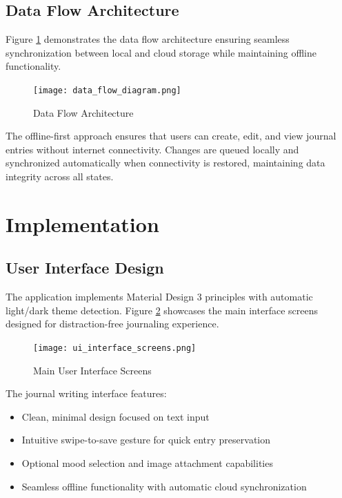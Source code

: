 \documentclass[conference]{IEEEtran}
\begin{document}
{\begin{IEEEkeywords}
\subsection{Data Flow Architecture}

Figure \ref{fig:data_flow} demonstrates the data flow architecture ensuring seamless synchronization between local and cloud storage while maintaining offline functionality.

\begin{figure}[htbp]
\centerline{\texttt{[image: data\_flow\_diagram.png]}}
\caption{Data Flow Architecture}
\label{fig:data_flow}
\end{figure}

The offline-first approach ensures that users can create, edit, and view journal entries without internet connectivity. Changes are queued locally and synchronized automatically when connectivity is restored, maintaining data integrity across all states.

\section{Implementation}

\subsection{User Interface Design}

The application implements Material Design 3 principles with automatic light/dark theme detection. Figure \ref{fig:ui_screens} showcases the main interface screens designed for distraction-free journaling experience.

\begin{figure}[htbp]
\centerline{\texttt{[image: ui\_interface\_screens.png]}}
\caption{Main User Interface Screens}
\label{fig:ui_screens}
\end{figure}

The journal writing interface features:
\begin{itemize}
\item Clean, minimal design focused on text input
\item Intuitive swipe-to-save gesture for quick entry preservation
\item Optional mood selection and image attachment capabilities
\item Seamless offline functionality with automatic cloud synchronization
\end{itemize}


\end{IEEEkeywords}}
\end{document}
